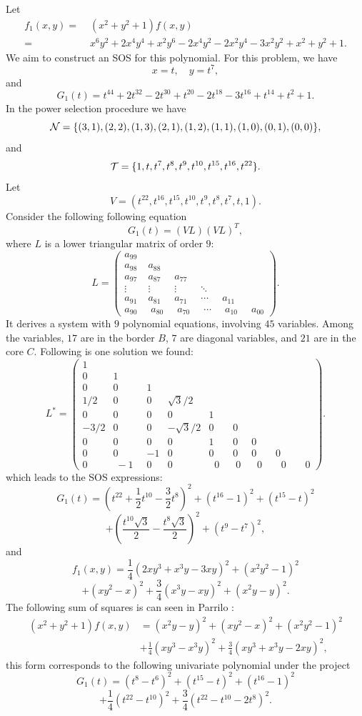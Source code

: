 \documentclass[runningheads]{llncs}
\begin{document}
{Let 
\begin{align*}
f_1(x,y)=&\;(x^2 + y^2 + 1) f(x,y)\\    
=&\;x^6 y^2 + 2 x^4 y^4 + x^2 y^6 - 2 x^4 y^2 - 2 x^2 y^4 - 3 x^2 y^2 + x^2 + y^2 + 1.
\end{align*}
We aim to construct an SOS for this polynomial. For this problem, we have
$$
x=t,\quad y=t^7,
$$
and
$$
G_1(t)=t^{44}+2t^{32}-2t^{30}+t^{20}-2t^{18} 
-3t^{16}+t^{14}+t^2+1. 
$$
In the power selection procedure we have
$$
{\cal N}=\{(3,1),(2,2),(1,3),(2,1),(1,2),(1,1),(1,0),(0,1),(0,0)\}, 
$$
and
$$
{\cal T} = \{1, t, t^7, t^8, t^9, t^{10}, t^{15}, t^{16}, t^{22}\}.
$$
Let 
$$
V=\left(t^{22},t^{16},t^{15},t^{10},t^{9},t^{8},t^{7},t,1\right).  
$$
Consider the following following equation
$$
G_1(t)=(VL)(VL)^T,
$$
where $L$ is a lower triangular matrix of order $9$:
$$
L=\left(\begin{array}{cccccc}
a_{99}&\\
a_{98}&a_{88}&\\
a_{97}&a_{87}&a_{77}&\\
\vdots&\vdots&\vdots&\ddots&\\
a_{91}&a_{81}&a_{71}&\cdots&a_{11}&\\
a_{90}\;&\;a_{80}\;&\;a_{70}\;&\;\cdots\;&\;a_{10}\;&\;a_{00}
\end{array}
\right).
$$
It derives a system with $9$ polynomial equations, involving $45$ variables. Among the variables, $17$ are in the border $B$, $7$ are diagonal variables, and $21$ are in the core $C$. Following is one solution we found:
$$
L^{\ast}=\left(\begin{array}{ccccccccc}
1&\\
0&1&\\
0&0&1&\\
1/2&0&0&\sqrt{3}/2&\\
0&0&0&0&1&\\
-3/2&0&0&-\sqrt{3}/2&0&0\\
0&0&0&0&1&0&0\\
0&0&-1&0&0&0&0&0\\
0&\;-1\;\;&0&0&\;\;0\;\;&\;0\;&\;\;0\;\;&\;\;0\;\;&\;\;0
\end{array}
\right).
$$
which leads to the SOS expressions:
$$
G_1(t) = \left(t^{22} + \frac{1}{2} t^{10} - \frac{3}{2} t^8 \right)^2 + \left(t^{16} - 1\right)^2
+ \left(t^{15} - t \right)^2 
$$ 
$$
+ \left( \frac{t^{10} \sqrt{3}}{2} - \frac{t^8 \sqrt{3}}{2} \right)^2 + \left(t^9 - t^7\right)^2,
$$
and
$$
f_1(x,y) = \frac{1}{4} \left( 2xy^3 + x^3 y - 3xy \right)^2 + (x^2 y^2 - 1)^2 
$$
$$
+ (xy^2 - x)^2 + \frac{3}{4} (x^3 y - xy)^2 + (x^2 y - y)^2.
$$
The following sum of squares is can seen in Parrilo \cite{Parrilo2003}:
\begin{align*}
(x^2 + y^2 + 1) f(x,y) &= \left( x^2 y - y \right)^2 + \left( xy^2 - x \right)^2 + \left( x^2 y^2 - 1 \right)^2 \\
&+ \frac{1}{4} \left( xy^3 - x^3 y \right)^2 + \frac{3}{4} \left( xy^3 + x^3 y - 2xy \right)^2,
\end{align*}
this form corresponds to the following univariate polynomial under the project %
$$
G_1(t)=(t^8-t^6)^2+(t^{15}-t)^2+(t^{16}-1)^2
$$
$$
+
\frac{1}{4}(t^{22}-t^{10})^2+\frac{3}{4}(t^{22}-t^{10}-2t^{8})^2. 
$$


}
\end{document}
